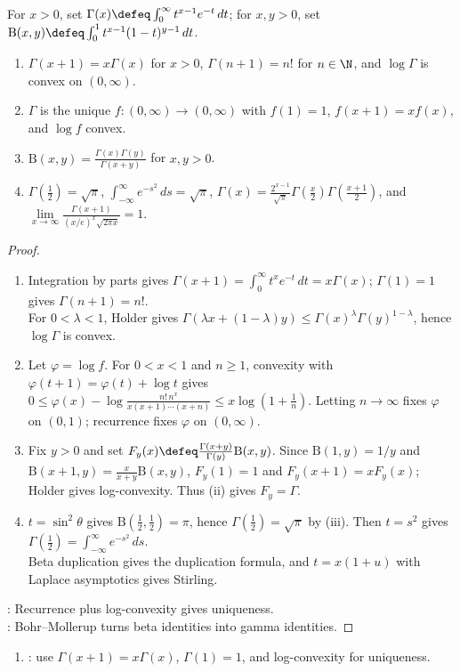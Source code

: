\begin{theorem} \label{thm:gamma-function-basic-theory} \\
For $x>0$, set $\Gamma(x)\defeq\int_0^\infty t^{x-1}e^{-t}\,dt$; for $x,y>0$, set $\mathrm{B}(x,y)\defeq\int_0^1t^{x-1}(1-t)^{y-1}\,dt$.
\begin{enumerate}[label=(\roman*)]
\setlength{\itemsep}{0pt}
\item $\Gamma(x+1)=x\Gamma(x)$ for $x>0$, $\Gamma(n+1)=n!$ for $n\in\N$, and $\log\Gamma$ is convex on $(0,\infty)$.
\item $\Gamma$ is the unique $f:(0,\infty)\to(0,\infty)$ with $f(1)=1$, $f(x+1)=xf(x)$, and $\log f$ convex.
\item $\mathrm{B}(x,y)=\frac{\Gamma(x)\Gamma(y)}{\Gamma(x+y)}$ for $x,y>0$.
\item $\Gamma\!\left(\frac12\right)=\sqrt{\pi}$, $\int_{-\infty}^{\infty}e^{-s^2}\,ds=\sqrt{\pi}$, $\Gamma(x)=\frac{2^{x-1}}{\sqrt{\pi}}\Gamma\!\left(\frac{x}{2}\right)\Gamma\!\left(\frac{x+1}{2}\right)$, and $\lim\limits_{x\to\infty}\frac{\Gamma(x+1)}{(x/e)^x\sqrt{2\pi x}}=1$.
\end{enumerate}
\begin{proof}
\begin{enumerate}[label=(\roman*)]
\setlength{\itemsep}{0pt}
\item Integration by parts gives $\Gamma(x+1)=\int_0^\infty t^xe^{-t}\,dt=x\Gamma(x)$; $\Gamma(1)=1$ gives $\Gamma(n+1)=n!$.\\
For $0<\lambda<1$, Holder gives $\Gamma(\lambda x+(1-\lambda)y)\leq\Gamma(x)^\lambda\Gamma(y)^{1-\lambda}$, hence $\log\Gamma$ is convex.
\item Let $\varphi=\log f$. For $0<x<1$ and $n\geq1$, convexity with $\varphi(t+1)=\varphi(t)+\log t$ gives\\
$0\leq\varphi(x)-\log\!\frac{n!\,n^x}{x(x+1)\cdots(x+n)}\leq x\log(1+\frac1n)$. Letting $n\to\infty$ fixes $\varphi$ on $(0,1)$; recurrence fixes $\varphi$ on $(0,\infty)$.
\item Fix $y>0$ and set $F_y(x)\defeq\frac{\Gamma(x+y)}{\Gamma(y)}\mathrm{B}(x,y)$. Since $\mathrm{B}(1,y)=1/y$ and $\mathrm{B}(x+1,y)=\frac{x}{x+y}\mathrm{B}(x,y)$, $F_y(1)=1$ and $F_y(x+1)=xF_y(x)$; Holder gives log-convexity. Thus (ii) gives $F_y=\Gamma$.
\item $t=\sin^2\theta$ gives $\mathrm{B}(\frac12,\frac12)=\pi$, hence $\Gamma(\frac12)=\sqrt{\pi}$ by (iii). Then $t=s^2$ gives $\Gamma(\frac12)=\int_{-\infty}^{\infty}e^{-s^2}\,ds$.\\
Beta duplication gives the duplication formula, and $t=x(1+u)$ with Laplace asymptotics gives Stirling.
\end{enumerate}
: Recurrence plus log-convexity gives uniqueness.\\
: Bohr--Mollerup turns beta identities into gamma identities.
\end{proof}
\end{theorem}

\begin{method} \label{meth:gamma-function-proof-pattern} 
\begin{enumerate}[label=(\roman*)]
\setlength{\itemsep}{0pt}
\item {}: use $\Gamma(x+1)=x\Gamma(x)$, $\Gamma(1)=1$, and log-convexity for uniqueness.
\end{enumerate}
\end{method}
